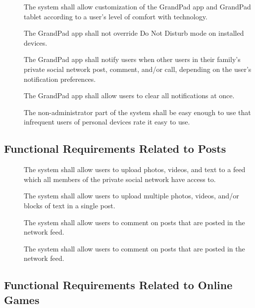 \begin{description}
    \item[\textbf{\showfuncuicounter}]
        The system shall allow customization of the GrandPad app and GrandPad
            tablet according to a user's level of comfort with technology.
    \item[\textbf{\showfuncuicounter}]
        The GrandPad app shall not override Do Not Disturb mode on installed
            devices.
    \item[\textbf{\showfuncuicounter}]
        The GrandPad app shall notify users when other users in their family's
            private social network post, comment, and/or call, depending on the
            user's notification preferences.
    \item[\textbf{\showfuncuicounter}]
        The GrandPad app shall allow users to clear all notifications at
            once.
    \item[\textbf{\showfuncuicounter}]
        The non-administrator part of the system shall be easy enough to use
            that infrequent users of personal devices rate it easy to use.
\end{description}

\subsection*{Functional Requirements Related to Posts}

\begin{description}
    \item[\textbf{\showfuncpostcounter}]
        The system shall allow users to upload photos, videos, and text to a
            feed which all members of the private social network have access to.
    \item[\textbf{\showfuncpostcounter}]
        The system shall allow users to upload multiple photos, videos, and/or
            blocks of text in a single post.
    \item[\textbf{\showfuncpostcounter}]
        The system shall allow users to comment on posts that are posted in the
            network feed.
    \item[\textbf{\showfuncpostcounter}]
        The system shall allow users to comment on posts that are posted in the
            network feed.
\end{description}

\subsection*{Functional Requirements Related to Online Games}

